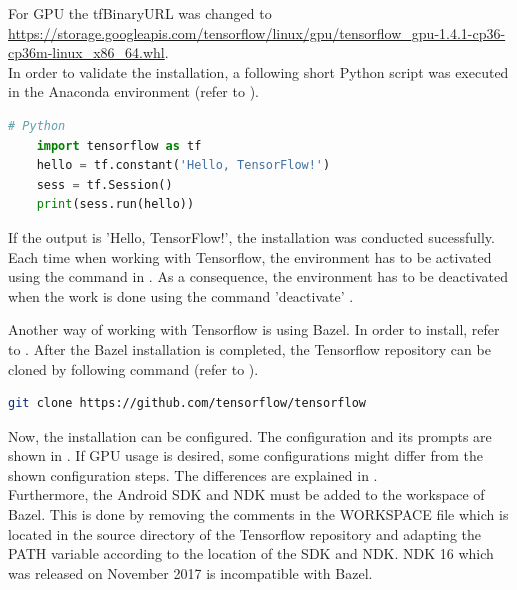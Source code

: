 For GPU the tfBinaryURL was changed to \url{https://storage.googleapis.com/tensorflow/linux/gpu/tensorflow_gpu-1.4.1-cp36-cp36m-linux_x86_64.whl}. \\

In order to validate the installation, a following short Python script was executed in the Anaconda environment (refer to ).

\begin{minipage}{\linewidth}
\begin{lstlisting}[caption=Installing Tensorflow through Anaconda, label=list:validation_installation, language=python]
	# Python
	import tensorflow as tf
	hello = tf.constant('Hello, TensorFlow!')
	sess = tf.Session()
	print(sess.run(hello))
\end{lstlisting}
\end{minipage}

If the output is 'Hello, TensorFlow!', the installation was conducted sucessfully. Each time when working with Tensorflow, the environment has to be activated using the command in . As a consequence, the environment has to be deactivated when the work is done using the command 'deactivate' \citep{InstallTensorflow}.

Another way of working with Tensorflow is using Bazel. In order to install, refer to . 
After the Bazel installation is completed, the Tensorflow repository can be cloned by following command (refer to ).

\begin{minipage}{\linewidth}
\begin{lstlisting}[caption=Cloning the tensorflow repository, label=list:clone_tensorflow, language=bash]
	git clone https://github.com/tensorflow/tensorflow		
\end{lstlisting}
\end{minipage}

Now, the installation can be configured. The configuration and its prompts are shown in . If GPU usage is desired, some configurations might differ from the shown configuration steps. The differences are explained in .\\

Furthermore, the Android SDK and NDK must be added to the workspace of Bazel. This is done by removing the comments in the WORKSPACE file which is located in the source directory of the Tensorflow repository and adapting the PATH variable according to the location of the SDK and NDK. NDK 16 which was released on November 2017 is incompatible with Bazel. \\

